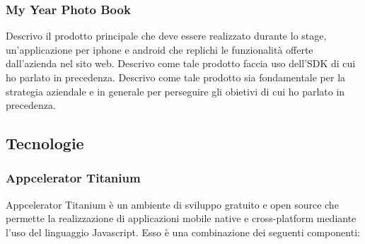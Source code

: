 			\subsubsection{My Year Photo Book}
				Descrivo il prodotto principale che deve essere realizzato durante lo stage, un'applicazione per iphone e android
				che replichi le funzionalità offerte dall'azienda nel sito web. Descrivo come tale prodotto faccia uso dell'SDK
				di cui ho parlato in precedenza. Descrivo come tale prodotto sia fondamentale per la strategia aziendale e in
				generale per perseguire gli obietivi di cui ho parlato in precedenza.
		\subsection{Tecnologie}
			\subsubsection{Appcelerator Titanium}
				Appcelerator Titanium è un ambiente di sviluppo gratuito e open source che permette la realizzazione di applicazioni
				mobile native e cross-platform mediante l'uso del linguaggio Javascript.
				Esso è una combinazione dei seguenti componenti:
